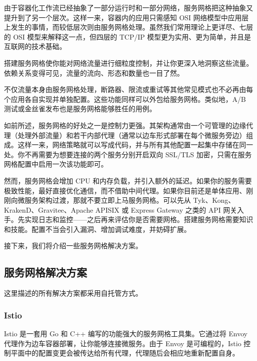 由于容器化工作流已经抽象了一部分运行时和一部分网络，服务网格把这种抽象又提升到了另一个层次。这样一来，容器内的应用只需感知 OSI 网络模型中应用层上发生的事情，而较低层次则由服务网格处理。虽然我们常用理论上更详尽、七层的 OSI 模型来解释这一点，但四层的 TCP/IP 模型更为实用、更为简单，并且是互联网的技术基础。


搭建服务网格使你能对网络流量进行细粒度控制，并让你更深入地洞察这些流量。依赖关系变得可见，流量的流向、形态和数量也一目了然。

不仅流量本身由服务网格处理，断路器、限流或重试等其他常见模式也不必再由每个应用各自实现并单独配置。这些功能同样可以外包给服务网格。类似地，A/B 测试或金丝雀发布也是服务网格能够胜任的用例。

\label{idx:2043}
如前所述，服务网格的好处之一是控制力更强。其架构通常由一个可管理的边缘代理（处理外部流量）和若干内部代理（通常以边车形式部署在每个微服务旁边）组成。这样一来，网络策略就可以写成代码，并与所有其他配置一起集中存储在同一处。你不再需要为想要连接的两个服务分别开启双向 SSL/TLS 加密，只需在服务网格配置中启用一次该功能即可。

然而，服务网格会增加 CPU 和内存负载，并引入额外的延迟。如果你的服务需要极致性能，最好直接优化通信，而不借助中间代理。如果你目前还是单体应用、刚刚向微服务架构过渡，那就不要立即上马服务网格。可以先从 Tyk、Kong、KrakenD、Gravitee、Apache APISIX 或 Express Gateway 之类的 API 网关入手。先实现日志和监控——之后再来评估你是否需要网格。搭建服务网格需要知识和技能。配置不当会引入漏洞、增加调试难度，并妨碍扩展。

接下来，我们将介绍一些服务网格解决方案。

\subsection{服务网格解决方案}

\label{idx:2044}
这里描述的所有解决方案都采用自托管方式。

\subsubsection{Istio}

\label{idx:2045}
\label{idx:2046}
Istio 是一套用 Go 和 C++ 编写的功能强大的服务网格工具集。它通过将 Envoy 代理作为边车容器部署，让你能够连接微服务。由于 Envoy 是可编程的，Istio 控制平面中的配置变更会被传达给所有代理，代理随后会相应地重新配置自身。


